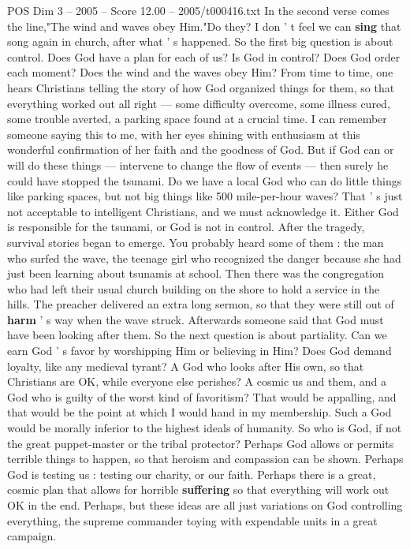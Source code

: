 \begin{textsample}{POS Dim 3 – 2005 – Score 12.00 – 2005/t000416.txt}
In the second verse comes the line,"The wind and waves obey Him."Do they?
I don ' t feel we can \textbf{sing} that song again in church, after what ' s happened.
So the first big question is about control.
Does God have a plan for each of us?
Is God in control?
Does God order each moment?
Does the wind and the waves obey Him?
From time to time, one hears Christians telling the story of how God organized things for them, so that everything worked out all right — some difficulty overcome, some illness cured, some trouble averted, a parking space found at a crucial time.
I can remember someone saying this to me, with her eyes shining with enthusiasm at this wonderful confirmation of her faith and the goodness of God.
But if God can or will do these things — intervene to change the flow of events — then surely he could have stopped the tsunami.
Do we have a local God who can do little things like parking spaces, but not big things like 500 mile-per-hour waves?
That ' s just not acceptable to intelligent Christians, and we must acknowledge it.
Either God is responsible for the tsunami, or God is not in control.
After the tragedy, survival stories began to emerge.
You probably heard some of them : the man who surfed the wave, the teenage girl who recognized the danger because she had just been learning about tsunamis at school.
Then there was the congregation who had left their usual church building on the shore to hold a service in the hills.
The preacher delivered an extra long sermon, so that they were still out of \textbf{harm} ' s way when the wave struck.
Afterwards someone said that God must have been looking after them.
So the next question is about partiality.
Can we earn God ' s favor by worshipping Him or believing in Him?
Does God demand loyalty, like any medieval tyrant?
A God who looks after His own, so that Christians are OK, while everyone else perishes?
A cosmic us and them, and a God who is guilty of the worst kind of favoritism?
That would be appalling, and that would be the point at which I would hand in my membership.
Such a God would be morally inferior to the highest ideals of humanity.
So who is God, if not the great puppet-master or the tribal protector?
Perhaps God allows or permits terrible things to happen, so that heroism and compassion can be shown.
Perhaps God is testing us : testing our charity, or our faith.
Perhaps there is a great, cosmic plan that allows for horrible \textbf{suffering} so that everything will work out OK in the end.
Perhaps, but these ideas are all just variations on God controlling everything, the supreme commander toying with expendable units in a great campaign.

\end{textsample}
